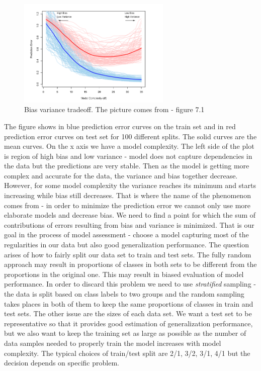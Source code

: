 \documentclass[12pt, wide]{mwart}
\begin{document}
\begin{figure}
\centering
\includegraphics[width=0.65\textwidth]{images/BiasVarianceTrade.png}
\caption{Bias variance tradeoff. The picture comes from \cite{ESL2} - figure 7.1}
\label{fig:biasVarTrade}
\end{figure}

The figure shows in blue prediction error curves on the train set and in red prediction error curves on test set for 100 different splits. The solid curves are the mean curves. On the x axis we have a model complexity. The left side of the plot is region of high bias and low variance - model does not capture dependencies in the data but the predictions are very stable. Then as the model is getting more complex and accurate for the data, the variance and bias together decrease. However, for some model complexity the variance reaches its minimum and starts increasing while bias still decreases. That is where the name of the phenomenon comes from - in order to minimize the prediction error we cannot only use more elaborate models and decrease bias. We need to find a point for which the sum of contributions of errors resulting from bias and variance is minimized. That is our goal in the process of model assessment - choose a model capturing most of the regularities in our data but also good generalization performance. The question arises of how to fairly split our data set to train and test sets. The fully random approach may result in proportions of classes in both sets to be different from the proportions in the original one. This may result in biased evaluation of model performance. In order to discard this problem we need to use \textit{stratified} sampling - the data is split based on class labels to two groups and the random sampling takes places in both of them to keep the same proportions of classes in train and test sets. The other issue are the sizes of each data set. We want a test set to be representative so that it provides good estimation of generalization performance, but we also want to keep the training set as large as possible as the number of data samples needed to properly train the model increases with model complexity.  The typical choices of train/test split are 2/1, 3/2, 3/1, 4/1 but the decision depends on specific problem.  
\end{document}
